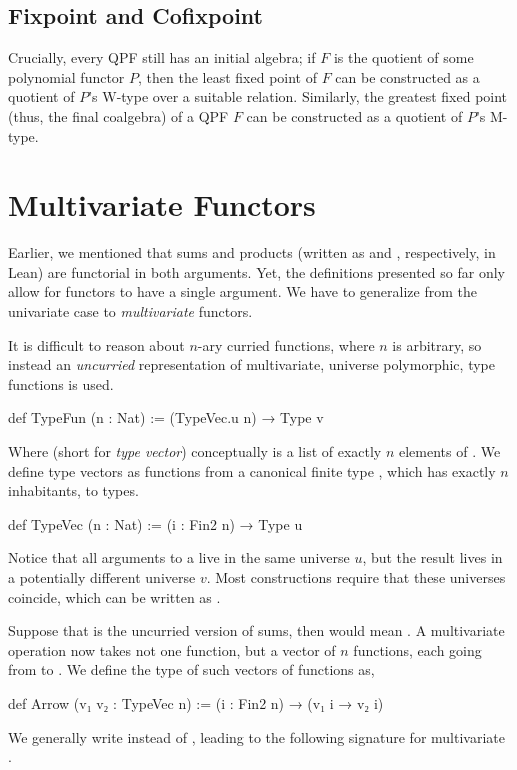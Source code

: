 \subsection*{Fixpoint and Cofixpoint}
Crucially, every QPF still has an initial algebra; if $F$ is the quotient of some polynomial functor
$P$, then the least fixed point of $F$ can be constructed as a quotient of $P$'s W-type over a suitable
relation.
Similarly, the greatest fixed point (thus, the final coalgebra) of a QPF $F$ can be constructed as
a quotient of $P$'s M-type.







\section{Multivariate Functors}
\label{sec:mvfunctor}

Earlier, we mentioned that sums and products (written as  and , respectively, in Lean) are functorial in both arguments.
Yet, the definitions presented so far only allow for functors to have a single argument.
We have to generalize from the univariate case to \emph{multivariate} functors.

It is difficult to reason about $n$-ary curried functions, where $n$ is arbitrary, so instead an \emph{uncurried} representation of multivariate, universe polymorphic, type functions is used.

\begin{leancode}
    def TypeFun (n : Nat) := (TypeVec.{u} n) → Type v
\end{leancode}
Where  (short for \emph{type vector}) conceptually is a list of exactly $n$ elements of .
We define type vectors as functions from a canonical finite type , which has exactly $n$ inhabitants,
to types.
\begin{leancode}
    def TypeVec (n : Nat) := (i : Fin2 n) → Type u
\end{leancode}
Notice that all arguments to a  live in the same universe $u$, but the result lives in a potentially different universe $v$. 
Most constructions require that these universes coincide, which can be written as .

Suppose that  is the uncurried version of sums, then  would mean .
A multivariate  operation now takes not one function, but a vector of $n$ functions, each going from  to . We define the type of such vectors of functions as,
\begin{leancode}    
    def Arrow (v₁ v₂ : TypeVec n) := (i : Fin2 n) → (v₁ i → v₂ i)
\end{leancode}  
We generally write  instead of , leading to the following signature
for multivariate .

